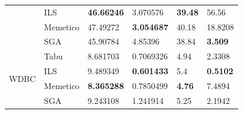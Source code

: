 \documentclass[11pt]{article}
\begin{document}
\begin{table}[h]
{\begin{tabular}{ |l|l|l|l|l|l| }
                              & ILS      & \bf{46.66246}   & 3.070576     & \bf{39.48}   & 56.56 \\
                              & Memetico & 47.49272   & \bf{3.054687}     & 40.18   & 18.8208 \\
                              & SGA      & 45.90784   & 4.85396      & 38.84   & \bf{3.509}\\ \hline
    \multirow{4}{*}{WDBC} & Tabu     & 8.681703   & 0.7069326    & 4.94    & 2.3308 \\
                          & ILS      & 9.489349   & \bf{0.601433}     & 5.4     & \bf{0.5102} \\
                          & Memetico & \bf{8.365288}   & 0.7850499    & \bf{4.76}    & 7.4894 \\
                          & SGA      & 9.243108   & 1.241914     & 5.25    & 2.1942\\ \hline
\end{tabular}
}
\end{table}

\begin{table}[h]
\end{table}
\end{document}
